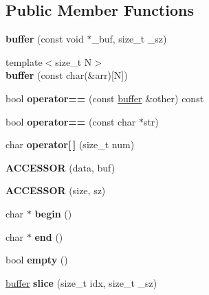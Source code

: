 \subsection*{Public Member Functions}
\begin{DoxyCompactItemize}
\item 
{\bfseries buffer} (const void $\ast$\+\_\+buf, size\+\_\+t \+\_\+sz)\hypertarget{classgxx_1_1buffer_ab50e6857985ce25bc482ac4a915adf54}{}\label{classgxx_1_1buffer_ab50e6857985ce25bc482ac4a915adf54}

\item 
{\footnotesize template$<$size\+\_\+t N$>$ }\\{\bfseries buffer} (const char(\&arr)\mbox{[}N\mbox{]})\hypertarget{classgxx_1_1buffer_ade202d73586e409e1ab396c87122eeba}{}\label{classgxx_1_1buffer_ade202d73586e409e1ab396c87122eeba}

\item 
bool {\bfseries operator==} (const \hyperlink{classgxx_1_1buffer}{buffer} \&other) const \hypertarget{classgxx_1_1buffer_a300eb1e67de3904c7c88535521b8f9b1}{}\label{classgxx_1_1buffer_a300eb1e67de3904c7c88535521b8f9b1}

\item 
bool {\bfseries operator==} (const char $\ast$str)\hypertarget{classgxx_1_1buffer_a49845b11c97de6da87ed93364a07ef7a}{}\label{classgxx_1_1buffer_a49845b11c97de6da87ed93364a07ef7a}

\item 
char {\bfseries operator\mbox{[}$\,$\mbox{]}} (size\+\_\+t num)\hypertarget{classgxx_1_1buffer_a6b7b7877670efae896cbafa492873562}{}\label{classgxx_1_1buffer_a6b7b7877670efae896cbafa492873562}

\item 
{\bfseries A\+C\+C\+E\+S\+S\+OR} (data, buf)\hypertarget{classgxx_1_1buffer_a9beea8552a484e2605ce1fb94795fcf2}{}\label{classgxx_1_1buffer_a9beea8552a484e2605ce1fb94795fcf2}

\item 
{\bfseries A\+C\+C\+E\+S\+S\+OR} (size, sz)\hypertarget{classgxx_1_1buffer_a0ff37a6b6eab992deaaaf1a4e14bdc90}{}\label{classgxx_1_1buffer_a0ff37a6b6eab992deaaaf1a4e14bdc90}

\item 
char $\ast$ {\bfseries begin} ()\hypertarget{classgxx_1_1buffer_a2e2a945c167dc857f33b57ce676219ee}{}\label{classgxx_1_1buffer_a2e2a945c167dc857f33b57ce676219ee}

\item 
char $\ast$ {\bfseries end} ()\hypertarget{classgxx_1_1buffer_a5b4f116f5dacf672b98614a609fc6302}{}\label{classgxx_1_1buffer_a5b4f116f5dacf672b98614a609fc6302}

\item 
bool {\bfseries empty} ()\hypertarget{classgxx_1_1buffer_a9aaf7c7f29e6a870cde109ca7a02623f}{}\label{classgxx_1_1buffer_a9aaf7c7f29e6a870cde109ca7a02623f}

\item 
\hyperlink{classgxx_1_1buffer}{buffer} {\bfseries slice} (size\+\_\+t idx, size\+\_\+t \+\_\+sz)\hypertarget{classgxx_1_1buffer_aae963da3cb2afe7189638ae39fca540d}{}\label{classgxx_1_1buffer_aae963da3cb2afe7189638ae39fca540d}

\end{DoxyCompactItemize}
